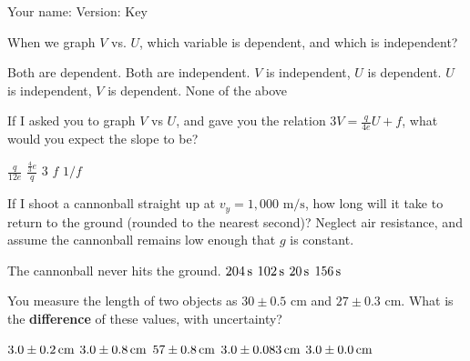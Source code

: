 \documentclass[answers]{exam}
\begin{document}
    
Your name:\enspace\makebox[2.5in]{\hrulefill} Version: Key %
\begin{center}
\end{center}

\begin{questions}

\question When we graph $V$ vs. $U$, which variable is dependent, and which is independent?
\begin{choices}
\choice Both are dependent.
\choice Both are independent.
\choice $V$ is independent, $U$ is dependent.
\CorrectChoice $U$ is independent, $V$ is dependent.
\choice None of the above
\end{choices}

\question If I asked you to graph $V$ vs $U$, and gave you the relation $3 V = \frac{q}{4 e} U + f$, what would you expect the slope to be?
\begin{choices}
\CorrectChoice $\frac{q}{12 e}$
\choice $\frac{\frac{4}{3} e}{q}$
\choice $3$
\choice $f$
\choice $1/f$
\end{choices}

\question If I shoot a cannonball straight up at $v_y = 1,000 \textrm{ m/s}$, how long will it take to return to the ground (rounded to the nearest second)? Neglect air resistance, and assume the cannonball remains low enough that $g$ is constant.
\begin{choices}
\choice The cannonball never hits the ground.
\CorrectChoice $\unit[204]{s}$
\choice $\unit[102]{s}$
\choice $\unit[20]{s}$
\choice $\unit[156]{s}$
\end{choices}

\question You measure the length of two objects as $30 \pm 0.5 \textrm{ cm}$ and $27 \pm 0.3 \textrm{ cm}$. What is the \textbf{difference} of these values, with uncertainty?
\begin{choices}
\choice $\unit[3.0 \pm 0.2]{cm}$
\CorrectChoice $\unit[3.0 \pm 0.8]{cm}$ 
\choice $\unit[57  \pm 0.8]{cm}$
\choice $\unit[3.0 \pm 0.083]{cm}$
\choice $\unit[3.0 \pm 0.0]{cm}$
\end{choices}


\end{questions}
\end{document}

